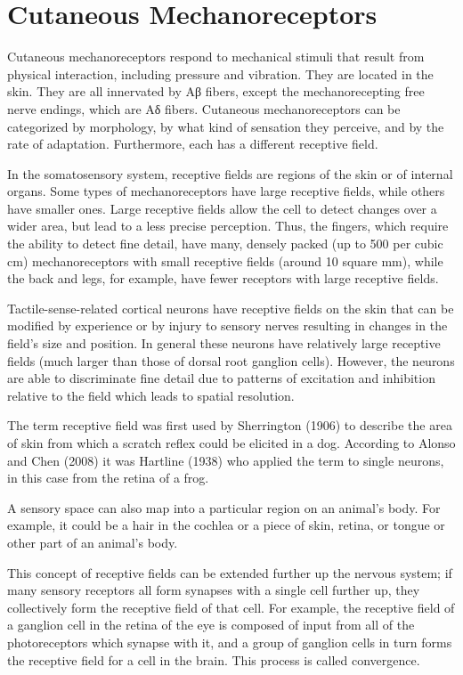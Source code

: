 \hypertarget{cutaneous-mechanoreceptors}{%
\section{Cutaneous Mechanoreceptors}\label{cutaneous-mechanoreceptors}}

Cutaneous mechanoreceptors respond to mechanical stimuli that result from physical interaction, including pressure and vibration. They are located in the skin. They are all innervated by Aβ fibers, except the mechanorecepting free nerve endings, which are Aδ fibers. Cutaneous mechanoreceptors can be categorized by morphology, by what kind of sensation they perceive, and by the rate of adaptation. Furthermore, each has a different receptive field.

In the somatosensory system, receptive fields are regions of the skin or of internal organs. Some types of mechanoreceptors have large receptive fields, while others have smaller ones. Large receptive fields allow the cell to detect changes over a wider area, but lead to a less precise perception. Thus, the fingers, which require the ability to detect fine detail, have many, densely packed (up to 500 per cubic cm) mechanoreceptors with small receptive fields (around 10 square mm), while the back and legs, for example, have fewer receptors with large receptive fields.

Tactile-sense-related cortical neurons have receptive fields on the skin that can be modified by experience or by injury to sensory nerves resulting in changes in the field's size and position. In general these neurons have relatively large receptive fields (much larger than those of dorsal root ganglion cells). However, the neurons are able to discriminate fine detail due to patterns of excitation and inhibition relative to the field which leads to spatial resolution.

The term receptive field was first used by Sherrington (1906) to describe the area of skin from which a scratch reflex could be elicited in a dog. According to Alonso and Chen (2008) it was Hartline (1938) who applied the term to single neurons, in this case from the retina of a frog.

A sensory space can also map into a particular region on an animal's body. For example, it could be a hair in the cochlea or a piece of skin, retina, or tongue or other part of an animal's body.

This concept of receptive fields can be extended further up the nervous system; if many sensory receptors all form synapses with a single cell further up, they collectively form the receptive field of that cell. For example, the receptive field of a ganglion cell in the retina of the eye is composed of input from all of the photoreceptors which synapse with it, and a group of ganglion cells in turn forms the receptive field for a cell in the brain. This process is called convergence.

